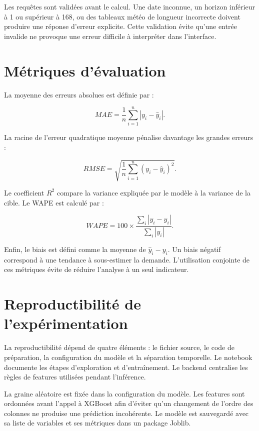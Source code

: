 \documentclass[12pt,a4paper]{report}
\begin{document}
Les requêtes sont validées avant le calcul. Une date inconnue, un horizon
inférieur à 1 ou supérieur à 168, ou des tableaux météo de longueur
incorrecte doivent produire une réponse d'erreur explicite. Cette validation
évite qu'une entrée invalide ne provoque une erreur difficile à interpréter
dans l'interface.

\section{Métriques d'évaluation}

La moyenne des erreurs absolues est définie par :

\begin{equation}
MAE = \frac{1}{n}\sum_{i=1}^{n}|y_i-\hat{y}_i|.
\end{equation}

La racine de l'erreur quadratique moyenne pénalise davantage les grandes
erreurs :

\begin{equation}
RMSE = \sqrt{\frac{1}{n}\sum_{i=1}^{n}(y_i-\hat{y}_i)^2}.
\end{equation}

Le coefficient $R^2$ compare la variance expliquée par le modèle à la variance
de la cible. Le WAPE est calculé par :

\begin{equation}
WAPE = 100 \times \frac{\sum_i |y_i-\hat{y}_i|}{\sum_i |y_i|}.
\end{equation}

Enfin, le biais est défini comme la moyenne de $\hat{y}_i-y_i$. Un biais
négatif correspond à une tendance à sous-estimer la demande. L'utilisation
conjointe de ces métriques évite de réduire l'analyse à un seul indicateur.

\section{Reproductibilité de l'expérimentation}

La reproductibilité dépend de quatre éléments : le fichier source, le code de
préparation, la configuration du modèle et la séparation temporelle. Le
notebook documente les étapes d'exploration et d'entraînement. Le backend
centralise les règles de features utilisées pendant l'inférence.

La graine aléatoire est fixée dans la configuration du modèle. Les features
sont ordonnées avant l'appel à XGBoost afin d'éviter qu'un changement de
l'ordre des colonnes ne produise une prédiction incohérente. Le modèle est
sauvegardé avec sa liste de variables et ses métriques dans un package Joblib.
\end{document}
